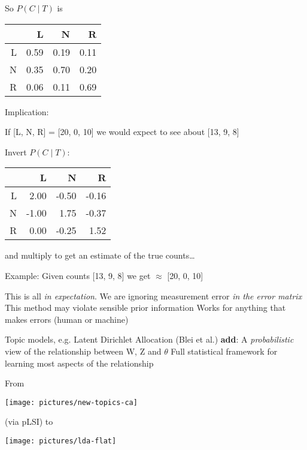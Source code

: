 \documentclass{mediumfoils}
\begin{document}
So $P(C \mid T)$ is

\begin{tabular}{rrrr}
  \hline
 & L & N & R \\ 
  \hline
L & 0.59 & 0.19 & 0.11 \\ 
  N & 0.35 & 0.70 & 0.20 \\ 
  R & 0.06 & 0.11 & 0.69 \\ 
   \hline
\end{tabular}

Implication:

If [L, N, R] = [20, 0, 10] 
\ita
\itm we would expect to see about [13, 9, 8]
\itz

\newpage 
Invert $P(C \mid T)$:

\begin{tabular}{rrrr}
  \hline
 & L & N & R \\ 
  \hline
L & 2.00 & -0.50 & -0.16 \\ 
  N & -1.00 & 1.75 & -0.37 \\ 
  R & 0.00 & -0.25 & 1.52 \\ 
   \hline
\end{tabular}

and multiply to get an estimate of the true counts\ldots

Example: 
\ita
\itm Given counts [13, 9, 8] we get 
\itm [L 20.19, -0.16,  9.98] $\approx$ [20, 0, 10]
\itz


\ita
\itm This is all \textit{in expectation}. 
\itm We are ignoring measurement error \textit{in the error matrix}
\itm This method may violate sensible prior information
\itm Works for anything that makes errors (human or machine)
\itz


Topic models, e.g. Latent Dirichlet Allocation (Blei et al.) \textbf{add}:
\ita
\itm A \textit{probabilistic} view of the relationship between W, Z and $\theta$ 
\itm Full statistical framework for learning most aspects of the relationship
\itz


From

\centerline{\texttt{[image: pictures/new-topics-ca]}}

(via pLSI) to

\centerline{\texttt{[image: pictures/lda-flat]}}

\end{document}
